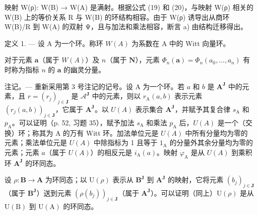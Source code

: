 映射 W(ρ): W(B) → W(A) 是满射。根据公式 (19) 和 (20)，与映射 W(ρ) 相关的 W(B) 上的等价关系 R 与 W(B) 的环结构相容。由于 W(ρ) 诱导出从商环 W(B)/R 到 W(A) 的双射 Ψ，且与加法和乘法相容，断言 a) 由结构迁移得出。

定义 1. --- 设 A 为一个环。称环 \(W(A)\) 为系数在 A 中的 Witt 向量环。

对于元素 \(\boldsymbol{a}\)（属于 \(W(A)\)）及 \(n\)（属于 \(\mathbf{N}\)），元素 \(\Phi_n(\boldsymbol{a}) = \Phi_n(a_0, \ldots, a_n)\) 有时称为指标 \(n\) 的 \(\boldsymbol{a}\) 的幽灵分量。

注记。--- 重新采用第 3 号注记的记号。设 A 为一个环。若 \(a\) 和 \(b\) 是 \(\mathbf{A}^{\mathbf{J}}\) 中的元素，且 \(r = (r_{j})_{j\in\mathbf{J}}\) 是 \(\mathcal{A}^{\mathbf{J}}\) 中的元素，则以 \(r_{\mathrm{A}}(a,b)\) 表示元素 \((r_{j}(a,b))_{j\in\mathbf{J}}\)，它属于 \(\mathbf{A}^{\mathbf{J}}\)。以 \(U(A)\) 表示集合 \(\mathbf{A}^{\mathbf{J}}\)，并赋予其复合律 \(s_{\mathrm{A}}\) 和 \(p_{\mathrm{A}}\)。可以证明（p. 52, 习题 35），赋予加法 \(s_{\mathrm{A}}\) 和乘法 \(p_{\mathrm{A}}\) 后，\(U(A)\) 是一个（交换）环；称其为 A 的万有 Witt 环。加法单位元是 \(U(A)\) 中所有分量均为零的元素；乘法单位元是 \(U(A)\) 中除指标为 1 且等于 \(1_{\mathrm{A}}\) 的分量外其余分量均为零的元素；元素 \(a\)（属于 \(U(A)\)）的相反元是 \(i_{\mathrm{A}}(a)\)。映射 \(\varphi_{\mathrm{A}}\) 是从 \(U(A)\) 到乘积环 \(\mathbf{A}^{\mathbf{J}}\) 的环同态。

设 \(\rho: \mathbf{B} \to \mathbf{A}\) 为环同态；以 \(\mathrm{U}(\rho)\) 表示从 \(\mathbf{B}^{\mathbf{J}}\) 到 \(\mathbf{A}^{\mathbf{J}}\) 的映射，它将元素 \((b_j)_{j \in \mathbf{J}}\)（属于 \(\mathbf{B}^{\mathbf{J}}\)）送到元素 \((\rho(b_j))_{j \in \mathbf{J}}\)（属于 \(\mathbf{A}^{\mathbf{J}}\)）。可以证明（同上）\(\mathrm{U}(\rho)\) 是从 \(\mathrm{U}(\mathrm{B})\) 到 \(\mathrm{U}(\mathrm{A})\) 的环同态。
